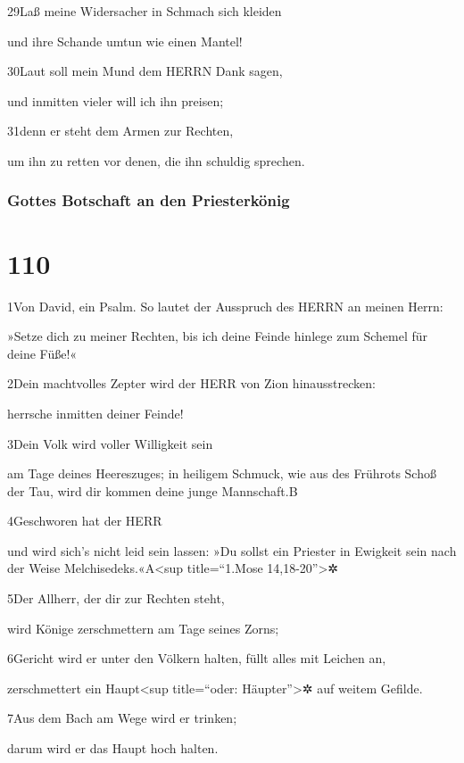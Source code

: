 29Laß meine Widersacher in Schmach sich kleiden

und ihre Schande umtun wie einen Mantel!

30Laut soll mein Mund dem HERRN Dank sagen,

und inmitten vieler will ich ihn preisen;

31denn er steht dem Armen zur Rechten,

um ihn zu retten vor denen, die ihn schuldig sprechen.

\hypertarget{gottes-botschaft-an-den-priesterkuxf6nig}{%
\subsubsection{Gottes Botschaft an den
Priesterkönig}\label{gottes-botschaft-an-den-priesterkuxf6nig}}

\hypertarget{section-109}{%
\section{110}\label{section-109}}

1Von David, ein Psalm. So lautet der Ausspruch des HERRN an meinen
Herrn:

»Setze dich zu meiner Rechten, bis ich deine Feinde hinlege zum Schemel
für deine Füße!«

2Dein machtvolles Zepter wird der HERR von Zion hinausstrecken:

herrsche inmitten deiner Feinde!

3Dein Volk wird voller Willigkeit sein

am Tage deines Heereszuges; in heiligem Schmuck, wie aus des Frührots
Schoß der Tau, wird dir kommen deine junge Mannschaft.{B}

4Geschworen hat der HERR

und wird sich's nicht leid sein lassen: »Du sollst ein Priester in
Ewigkeit sein nach der Weise Melchisedeks.«{A}\textless sup
title=``1.Mose 14,18-20''\textgreater✲

5Der Allherr, der dir zur Rechten steht,

wird Könige zerschmettern am Tage seines Zorns;

6Gericht wird er unter den Völkern halten, füllt alles mit Leichen an,

zerschmettert ein Haupt\textless sup title=``oder:
Häupter''\textgreater✲ auf weitem Gefilde.

7Aus dem Bach am Wege wird er trinken;

darum wird er das Haupt hoch halten.

